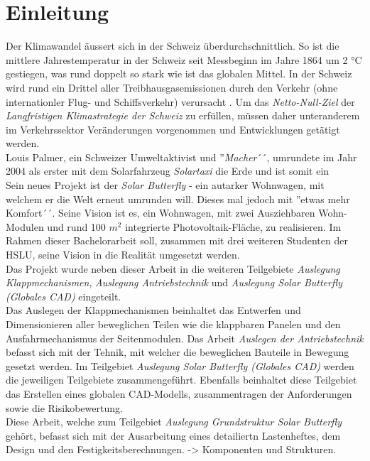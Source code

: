 \section{Einleitung}
Der Klimawandel äussert sich in der Schweiz überdurchschnittlich. So ist die mittlere Jahrestemperatur in der Schweiz seit Messbeginn im Jahre 1864 um 2 °C gestiegen, was rund doppelt so stark wie ist das globalen Mittel. In der Schweiz wird rund ein Drittel aller Treibhausgasemissionen durch den Verkehr (ohne internationler Flug- und Schiffsverkehr) verursacht \cite{BAFU}. Um das \emph{Netto-Null-Ziel} der \emph{Langfristigen Klimastrategie der Schweiz} zu erfüllen, müssen daher unteranderem im Verkehrssektor Veränderungen vorgenommen und Entwicklungen getätigt werden.\\
Louis Palmer, ein Schweizer Umweltaktivist und ''\emph{Macher}´´,  umrundete im Jahr 2004 als erster mit dem Solarfahrzeug \emph{Solartaxi} die Erde und ist somit ein \\

Sein neues Projekt ist der \emph{Solar Butterfly} - ein autarker Wohnwagen, mit welchem er die Welt erneut umrunden will. Dieses mal jedoch mit ''etwas mehr Komfort´´. Seine Vision ist es, ein Wohnwagen, mit zwei Ausziehbaren Wohn-Modulen und rund 100 $m^2$ integrierte Photovoltaik-Fläche, zu realisieren. Im Rahmen dieser Bachelorarbeit soll, zusammen mit drei weiteren Studenten der HSLU, seine Vision in die Realität umgesetzt werden.\\
Das Projekt wurde neben dieser Arbeit in die weiteren Teilgebiete \emph{Auslegung Klappmechanismen}, \emph{Auslegung Antriebstechnik} und \emph{Auslegung Solar Butterfly (Globales CAD)} eingeteilt.\\
Das Auslegen der Klappmechanismen beinhaltet das Entwerfen und Dimensionieren aller beweglichen Teilen wie die klappbaren Panelen und den Ausfahrmechanismus der Seitenmodulen. Das Arbeit \emph{Auslegen der Antriebstechnik} befasst sich mit der Tehnik, mit welcher die beweglichen Bauteile in Bewegung gesetzt werden. Im Teilgebiet \emph{Auslegung Solar Butterfly (Globales CAD)} werden die jeweiligen Teilgebiete zusammengeführt. Ebenfalls beinhaltet diese Teilgebiet das Erstellen eines globalen CAD-Modells, zusammentragen der Anforderungen sowie die Risikobewertung.\\

Diese Arbeit, welche zum Teilgebiet \emph{Auslegung Grundstruktur Solar Butterfly} gehört, befasst sich mit der Ausarbeitung eines detailiertn Lastenheftes, dem Design und den Festigkeitsberechnungen. -> Komponenten und Strukturen.


